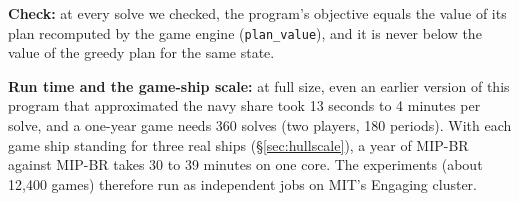 \begin{addblock}
\textbf{Check:} at every solve we checked, the program's objective equals the value of its plan recomputed by the
game engine (\texttt{plan\_value}), and it is never below the value of the greedy plan for the same state.

\textbf{Run time and the game-ship scale:} at full size, even an earlier version of this program that approximated the
navy share took 13 seconds to 4 minutes per solve, and a one-year game needs 360 solves (two players, 180 periods).
With each game ship standing for three real ships (\S\ref{sec:hullscale}), a year of MIP-BR against MIP-BR takes 30 to 39
minutes on one core. The experiments (about 12{,}400 games) therefore run as independent jobs on MIT's Engaging cluster.
\end{addblock}

